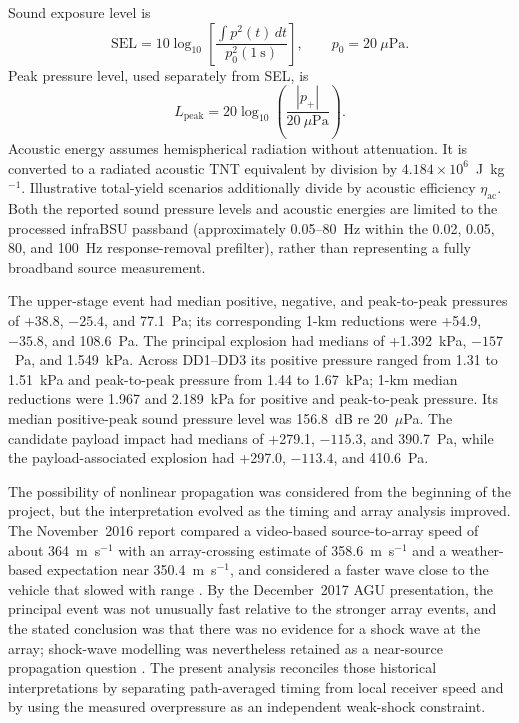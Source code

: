 \documentclass[]{seismica}
\begin{document}
Sound exposure level is
\begin{equation}
 \mathrm{SEL}=10\log_{10}\left[
 \frac{\int p^2(t)\,dt}{p_0^2(1~\mathrm{s})}\right],
 \qquad p_0=20~\mu\mathrm{Pa}.
\end{equation}
Peak pressure level, used separately from SEL, is
\begin{equation}
 L_{\mathrm{peak}}=20\log_{10}\left(\frac{|p_+|}{20~\mu\mathrm{Pa}}\right).
\end{equation}
Acoustic energy assumes hemispherical radiation without attenuation. It is
converted to a radiated acoustic TNT equivalent by division by
$4.184\times10^6$~J~kg$^{-1}$. Illustrative total-yield scenarios additionally
divide by acoustic efficiency $\eta_{\mathrm{ac}}$. Both the reported sound
pressure levels and acoustic energies are limited to the processed infraBSU
passband (approximately 0.05--80~Hz within the 0.02, 0.05, 80, and 100~Hz
response-removal prefilter), rather than representing a fully broadband source
measurement.

The upper-stage event had median positive, negative, and peak-to-peak
pressures of +38.8, $-25.4$, and 77.1~Pa; its corresponding 1-km reductions
were +54.9, $-35.8$, and 108.6~Pa. The principal explosion had medians of
+1.392~kPa, $-157$~Pa, and 1.549~kPa. Across DD1--DD3 its positive pressure
ranged from 1.31 to 1.51~kPa and peak-to-peak pressure from 1.44 to 1.67~kPa;
1-km median reductions were 1.967 and 2.189~kPa for positive and peak-to-peak
pressure. Its median positive-peak sound pressure level was 156.8~dB re
20~$\mu$Pa. The candidate payload impact had medians of +279.1, $-115.3$, and
390.7~Pa, while the payload-associated explosion had +297.0, $-113.4$, and
410.6~Pa.

The possibility of nonlinear propagation was considered from the beginning
of the project, but the interpretation evolved as the timing and array
analysis improved. The November~2016 report compared a video-based
source-to-array speed of about 364~m~s$^{-1}$ with an array-crossing estimate
of 358.6~m~s$^{-1}$ and a weather-based expectation near 350.4~m~s$^{-1}$,
and considered a faster wave close to the vehicle that slowed with range
\citep{thompson_mcnutt_fireball_2016}. By the December~2017 AGU presentation,
the principal event was not unusually fast relative to the stronger array
events, and the stated conclusion was that there was no evidence for a shock
wave at the array; shock-wave modelling was nevertheless retained as a
near-source propagation question \citep{thompson_agu_falcon9_2017}. The
present analysis reconciles those historical interpretations by separating
path-averaged timing from local receiver speed and by using the measured
overpressure as an independent weak-shock constraint.
\end{document}
